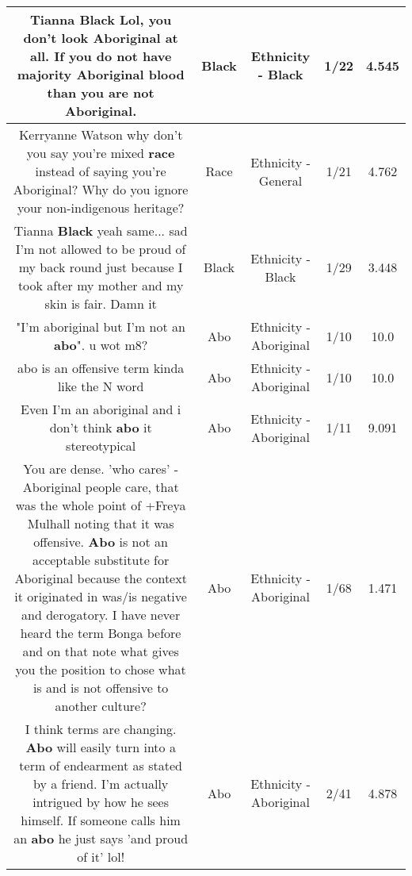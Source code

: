 \documentclass[11pt]{article}
\newlength\mylength
\begin{document}
\begin{center}
\begin{longtable}{|C{.65\mylength}|C{.30\mylength}|C{.12\mylength}|C{.12\mylength}|C{.12\mylength}|}
  \small Tianna \textbf{Black} Lol, you don't look Aboriginal at all. If you do not have majority Aboriginal blood than you are not Aboriginal.\normalsize   & Black & Ethnicity - Black & 1/22 & 4.545 \\  \hline
  \small Kerryanne Watson why don't you say you're mixed \textbf{race} instead of saying you're Aboriginal? Why do you ignore your non-indigenous heritage?\normalsize   & Race & Ethnicity - General & 1/21 & 4.762 \\  \hline
  \small Tianna \textbf{Black} yeah same... sad I'm not allowed to be proud of my back round just because I took after my mother and my skin is fair. Damn it\normalsize   & Black & Ethnicity - Black & 1/29 & 3.448 \\  \hline
  \small "I'm aboriginal but I'm not an \textbf{abo}". u wot m8?\normalsize   & Abo & Ethnicity - Aboriginal & 1/10 & 10.0 \\  \hline
  \small abo is an offensive term kinda like the N word\normalsize   & Abo & Ethnicity - Aboriginal & 1/10 & 10.0 \\  \hline
  \small Even I'm an aboriginal and i don't think \textbf{abo} it stereotypical\normalsize   & Abo & Ethnicity - Aboriginal & 1/11 & 9.091 \\  \hline
  \small You are dense. 'who cares' - Aboriginal people care, that was the whole point of +Freya Mulhall noting that it was offensive. \textbf{Abo} is not an acceptable substitute for Aboriginal because the context it originated in was/is negative and derogatory. I have never heard the term Bonga before and on that note what gives you the position to chose what is and is not offensive to another culture?\normalsize   & Abo & Ethnicity - Aboriginal & 1/68 & 1.471 \\  \hline
  \small I think terms are changing. \textbf{Abo} will easily turn into a term of endearment as stated by a friend. I'm actually intrigued by how he sees himself. If someone calls him an \textbf{abo} he just says 'and proud of it' lol!\normalsize   & Abo & Ethnicity - Aboriginal & 2/41 & 4.878 \\  \hline

\end{longtable}
\end{center}
\end{document}
